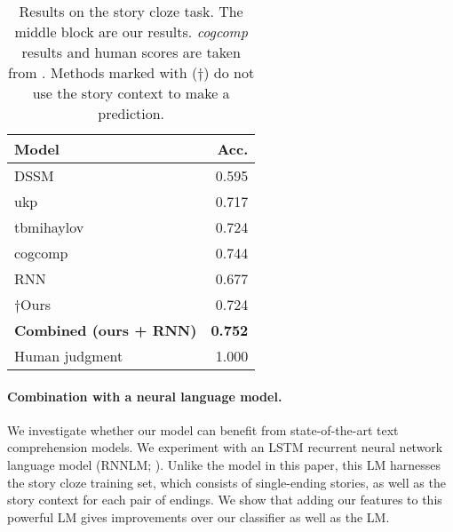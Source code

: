 \documentclass[11pt,a4paper]{article}
\newcommand{\com}[1]{}
\newcommand{\resolved}[1]{}
\newcommand{\shortv}[1]{}
\newcommand{\yc}[1]{{\color{bblue}\{\textit{#1}\}$_{yc}$}}
\newcommand{\nascomment}[1]{{\color{blue}\textsc{[#1 --nas]}}}
\renewcommand{\nascomment}[1]{}
\renewcommand{\yc}[1]{}
\begin{document}
\begin{table}[!t]
\begin{center}
\begin{tabular}{|l|r|} \hline
{\bf Model} & {\bf Acc.} \\ \hline
{DSSM} \cite{Mostafazadeh:2016} & 0.595 \\ 
{ukp} \cite{Bugert:2017} & 0.717\\ 
{tbmihaylov} \cite{Mihaylov:2017} & 0.724\\ 
{cogcomp}  & 0.744 \\ \hline\hline
{RNN}		& 0.677 \\ 
$\dagger${Ours} & {0.724} \\ 
{\bf Combined (ours + RNN)} & {\bf 0.752} \\ \hline\hline
Human judgment & 1.000 \\ \hline
\end{tabular}
\end{center}
\caption{\label{cloze_results}\resolved{\yc{we should change accuracy to be in 0-100\% scale to be consistent with Table 2}}Results on the \shortv{test set of the }story cloze task.\com{
The upper block shows published results, }
The middle block are our results.
{\it cogcomp} results and human \shortv{judgement }scores are taken from \cite{Mostafazadeh:2017}.
Methods marked with ($\dagger$) do not use the story context\shortv{ in order} to make a prediction. 
 \resolved{\nascomment{I added 0s to ``Niko'' result
  and ``human''
  so sig. digits would line up.  if we don't have sig digits for some
  of them, make the zeros white so the numbers line up.  where did the
human judgments come from?  those are not mentioned in our text anywhere!}
}}
\end{table}


\paragraph{Combination with a neural language model.}
We investigate whether our model can benefit from state-of-the-art text comprehension models\shortv{, for which this task was designed}. 
We experiment with an LSTM\shortv{-based} \cite{hochreiter1997long} recurrent neural network language model (RNNLM; \citealp{mikolov2010recurrent}). %
Unlike the model in this paper\shortv{, which only considers the story endings}, this LM \shortv{follows the protocol suggested by the story cloze task designers, and }harnesses the \shortv{ROC Stories }story cloze training set, which consists of single-ending stories, 
as well as the story context for each pair of endings. 
We show that adding our features to this powerful \shortv{language model}LM
gives improvements over our classifier as well as the \shortv{language
model}LM.  \resolved{\nascomment{reworded.  more important that our features help
  the language model, than the other way around!}}
\end{document}
